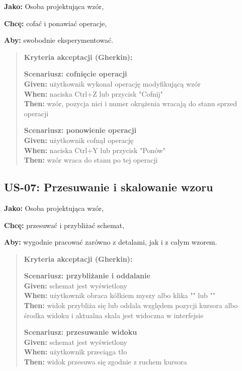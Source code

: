 \documentclass[a4paper,11pt]{article}
\begin{document}
\noindent\textbf{Jako:} Osoba projektująca wzór,\par
\noindent\textbf{Chcę:} cofać i ponawiać operacje,\par
\noindent\textbf{Aby:} swobodnie eksperymentować.\par

\begin{quote}
\textbf{Kryteria akceptacji (Gherkin):}

\textbf{Scenariusz: cofnięcie operacji} \\
\textbf{Given:} użytkownik wykonał operację modyfikującą wzór \\
\textbf{When:} naciska Ctrl+Z lub przycisk "Cofnij" \\
\textbf{Then:} wzór, pozycja nici i numer okrążenia wracają do stanu sprzed operacji

\textbf{Scenariusz: ponowienie operacji} \\
\textbf{Given:} użytkownik cofnął operację \\
\textbf{When:} naciska Ctrl+Y lub przycisk "Ponów" \\
\textbf{Then:} wzór wraca do stanu po tej operacji
\end{quote}

\subsection*{\textbf{US-07: Przesuwanie i skalowanie wzoru}}

\noindent\textbf{Jako:} Osoba projektująca wzór,\par
\noindent\textbf{Chcę:} przesuwać i przybliżać schemat,\par
\noindent\textbf{Aby:} wygodnie pracować zarówno z detalami, jak i z całym wzorem.\par

\begin{quote}
\textbf{Kryteria akceptacji (Gherkin):}

\textbf{Scenariusz: przybliżanie i oddalanie} \\
\textbf{Given:} schemat jest wyświetlony \\
\textbf{When:} użytkownik obraca kółkiem myszy albo klika "\text{+}" lub "\text{-}" \\
\textbf{Then:} widok przybliża się lub oddala względem pozycji kursora albo środka widoku i aktualna skala jest widoczna w interfejsie

\textbf{Scenariusz: przesuwanie widoku} \\
\textbf{Given:} schemat jest wyświetlony \\
\textbf{When:} użytkownik przeciąga tło \\
\textbf{Then:} widok przesuwa się zgodnie z ruchem kursora
\end{quote}
\end{document}
